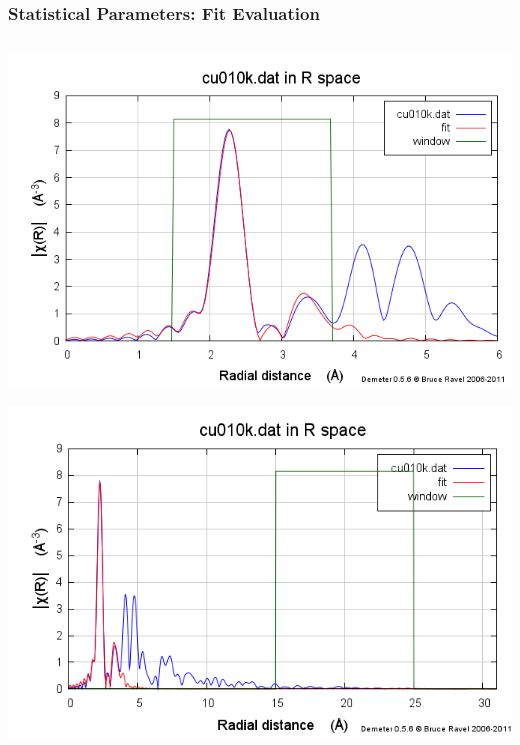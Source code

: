 \documentclass[10pt, xcolor=x11names, compress]{beamer}
\begin{document}
\begin{frame}
\begin{columns}[T]
\begin{column}{0.6\linewidth}
\begin{center}
        \medskip

      \end{center}
    \end{column}
  \end{columns}
\end{frame}

\begin{frame}
  \frametitle{Statistical Parameters: Fit Evaluation}

  \begin{columns}
    \begin{column}{0.3\linewidth}
      \includegraphics[width=\linewidth]{info/cufit_chirmag.png}      

      \includegraphics[width=\linewidth]{info/cu_chir0_31.png}      


\end{column}
\end{columns}
\end{frame}
\end{document}
